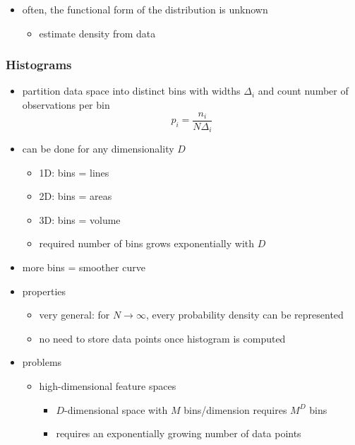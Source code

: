 \documentclass{article}
\begin{document}
\begin{itemize}
  \item often, the functional form of the distribution is unknown
  \begin{itemize}
    \item estimate density from data
  \end{itemize}
\end{itemize}

\subsubsection{Histograms}

\begin{itemize}
  \item partition data space into distinct bins with widths $\Delta_i$ and count number of observations per bin
  \[
    p_i = \frac{n_i}{N \Delta_i}
  \]
  \item can be done for any dimensionality $D$
  \begin{itemize}
    \item 1D: bins = lines
    \item 2D: bins = areas
    \item 3D: bins = volume
    \item required number of bins grows exponentially with $D$
  \end{itemize}
  \item more bins = smoother curve
  \item properties
  \begin{itemize}
    \item very general: for $N \rightarrow \infty$, every probability density can be represented
    \item no need to store data points once histogram is computed
  \end{itemize}
  \item problems
  \begin{itemize}
    \item high-dimensional feature spaces
    \begin{itemize}
      \item $D$-dimensional space with $M$ bins/dimension requires $M^D$ bins
      \item requires an exponentially growing number of data points
    \end{itemize}
  \end{itemize}
\end{itemize}
\end{document}
